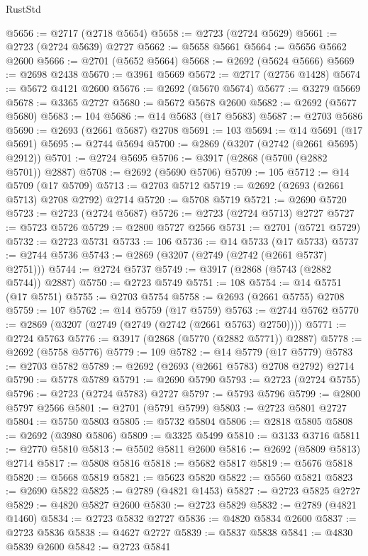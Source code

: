 \begin{lexlean}{RustStd}
\begin{coremodule}
{\begin{coremodule}
{{{{{{{{{{{{{{{{{{{{{{{{{{{{{{{{{{{{{{{@5656 := @2717 (@2718 @5654)
@5658 := @2723 (@2724 @5629)
@5661 := @2723 (@2724 @5639) @2727
@5662 := @5658 @5661
@5664 := @5656 @5662 @2600
@5666 := @2701 (@5652 @5664)
@5668 := @2692 (@5624 @5666)
@5669 := @2698 @2438
@5670 := @3961 @5669
@5672 := @2717 (@2756 @1428)
@5674 := @5672 @4121 @2600
@5676 := @2692 (@5670 @5674)
@5677 := @3279 @5669
@5678 := @3365 @2727
@5680 := @5672 @5678 @2600
@5682 := @2692 (@5677 @5680)
@5683 := 104
@5686 := @14 @5683 (@17 @5683)
@5687 := @2703 @5686
@5690 := @2693 (@2661 @5687) @2708
@5691 := 103
@5694 := @14 @5691 (@17 @5691)
@5695 := @2744 @5694
@5700 := @2869 (@3207 (@2742 (@2661 @5695) @2912))
@5701 := @2724 @5695
@5706 := @3917 (@2868 (@5700 (@2882 @5701)) @2887)
@5708 := @2692 (@5690 @5706)
@5709 := 105
@5712 := @14 @5709 (@17 @5709)
@5713 := @2703 @5712
@5719 := @2692 (@2693 (@2661 @5713) @2708 @2792) @2714
@5720 := @5708 @5719
@5721 := @2690 @5720
@5723 := @2723 (@2724 @5687)
@5726 := @2723 (@2724 @5713) @2727
@5727 := @5723 @5726
@5729 := @2800 @5727 @2566
@5731 := @2701 (@5721 @5729)
@5732 := @2723 @5731
@5733 := 106
@5736 := @14 @5733 (@17 @5733)
@5737 := @2744 @5736
@5743 := @2869 (@3207 (@2749 (@2742 (@2661 @5737) @2751)))
@5744 := @2724 @5737
@5749 := @3917 (@2868 (@5743 (@2882 @5744)) @2887)
@5750 := @2723 @5749
@5751 := 108
@5754 := @14 @5751 (@17 @5751)
@5755 := @2703 @5754
@5758 := @2693 (@2661 @5755) @2708
@5759 := 107
@5762 := @14 @5759 (@17 @5759)
@5763 := @2744 @5762
@5770 := @2869 (@3207 (@2749 (@2749 (@2742 (@2661 @5763) @2750))))
@5771 := @2724 @5763
@5776 := @3917 (@2868 (@5770 (@2882 @5771)) @2887)
@5778 := @2692 (@5758 @5776)
@5779 := 109
@5782 := @14 @5779 (@17 @5779)
@5783 := @2703 @5782
@5789 := @2692 (@2693 (@2661 @5783) @2708 @2792) @2714
@5790 := @5778 @5789
@5791 := @2690 @5790
@5793 := @2723 (@2724 @5755)
@5796 := @2723 (@2724 @5783) @2727
@5797 := @5793 @5796
@5799 := @2800 @5797 @2566
@5801 := @2701 (@5791 @5799)
@5803 := @2723 @5801 @2727
@5804 := @5750 @5803
@5805 := @5732 @5804
@5806 := @2818 @5805
@5808 := @2692 (@3980 @5806)
@5809 := @3325 @5499
@5810 := @3133 @3716
@5811 := @2770 @5810
@5813 := @5502 @5811 @2600
@5816 := @2692 (@5809 @5813) @2714
@5817 := @5808 @5816
@5818 := @5682 @5817
@5819 := @5676 @5818
@5820 := @5668 @5819
@5821 := @5623 @5820
@5822 := @5560 @5821
@5823 := @2690 @5822
@5825 := @2789 (@4821 @1453)
@5827 := @2723 @5825 @2727
@5829 := @4820 @5827 @2600
@5830 := @2723 @5829
@5832 := @2789 (@4821 @1460)
@5834 := @2723 @5832 @2727
@5836 := @4820 @5834 @2600
@5837 := @2723 @5836
@5838 := @4627 @2727
@5839 := @5837 @5838
@5841 := @4830 @5839 @2600
@5842 := @2723 @5841
}}}}}}}}}}}}}}}}}}}}}}}}}}}}}}}}}}}}}}}
\end{coremodule}}
\end{coremodule}
\end{lexlean}
